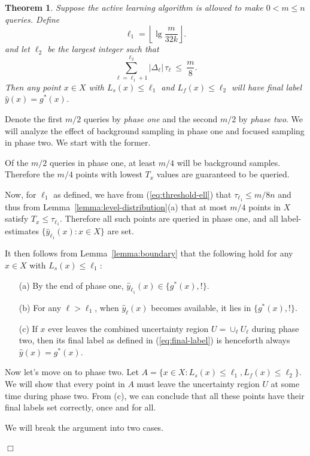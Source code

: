 \documentclass{article}
\def\yh{{\widehat{y}}}
\newtheorem{thm}{Theorem}
\newenvironment{proof}{\noindent {\sc Proof:}}{$\Box$ \medskip}
\begin{document}
\begin{thm}
Suppose the active learning algorithm is allowed to make $0 < m \leq n$ queries. Define
$$ \ell_1 = \left\lfloor \lg \frac{m}{32k} \right\rfloor .$$
and let $\ell_2$ be the largest integer such that
$$ \sum_{\ell = \ell_1 + 1}^{\ell_2} |\Delta_{\ell}| \, \tau_\ell \ \leq \ \frac{m}{8} .$$
Then any point $x \in X$ with $L_s(x) \leq \ell_1$ and $L_f(x) \leq \ell_2$ will have final label $\yh(x) = g^*(x)$.
\label{thm:label-complexity}
\end{thm}
\begin{proof}
Denote the first $m/2$ queries by {\it phase one} and the second $m/2$ by {\it phase two}. We will analyze the effect of background sampling in phase one and focused sampling in phase two. We start with the former.

Of the $m/2$ queries in phase one, at least $m/4$ will be background samples. Therefore the $m/4$ points with lowest $T_x$ values are guaranteed to be queried.

Now, for $\ell_1$ as defined, we have from (\ref{eq:threshold-ell}) that $\tau_{\ell_1} \leq m/8n$ and thus from Lemma~\ref{lemma:level-distribution}(a) that at most $m/4$ points in $X$ satisfy $T_x \leq \tau_{\ell_1}$. Therefore all such points are queried in phase one, and all label-estimates $\{\yh_{\ell_1}(x): x \in X\}$ are set.

It then follows from Lemma~\ref{lemma:boundary} that the following hold for any $x \in X$ with $L_s(x) \leq \ell_1$:
\begin{enumerate}
\item[(a)] By the end of phase one, $\yh_{\ell_1}(x) \in \{g^*(x), !\}$.
\item[(b)] For any $\ell > \ell_1$, when $\yh_\ell(x)$ becomes available, it lies in $\{g^*(x), !\}$.
\item[(c)] If $x$ ever leaves the combined uncertainty region $U = \cup_\ell U_\ell$ during phase two, then its final label as defined in (\ref{eq:final-label}) is henceforth always $\yh(x) = g^*(x)$.
\end{enumerate}

Now let's move on to phase two. Let $A = \{x \in X: L_s(x) \leq \ell_1, L_f(x) \leq \ell_2\}$. We will show that every point in $A$ must leave the uncertainty region $U$ at some time during phase two. From (c), we can conclude that all these points have their final labels set correctly, once and for all.

We will break the argument into two cases. 


\end{proof}
\end{document}
